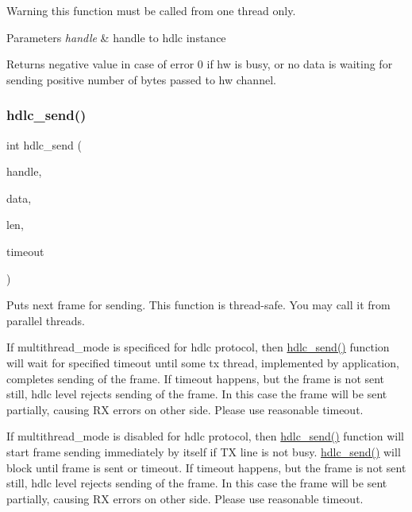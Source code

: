 \begin{DoxyWarning}{Warning}
this function must be called from one thread only.
\end{DoxyWarning}

\begin{DoxyParams}{Parameters}
{\em handle} & handle to hdlc instance \\
\hline
\end{DoxyParams}
\begin{DoxyReturn}{Returns}
negative value in case of error 0 if hw is busy, or no data is waiting for sending positive number of bytes passed to hw channel. 
\end{DoxyReturn}
\mbox{\label{group__HDLC__API_ga8b5cc456927145cebd82b2b560a6fa10}} 
\subsubsection{\texorpdfstring{hdlc\+\_\+send()}{hdlc\_send()}}
{\footnotesize\ttfamily int hdlc\+\_\+send (\begin{DoxyParamCaption}\item[{\hyperlink{group__HDLC__API_gabeaf7578aed5279d3af891bd85a9f961}{hdlc\+\_\+handle\+\_\+t}}]{handle,  }\item[{const void $\ast$}]{data,  }\item[{int}]{len,  }\item[{uint32\+\_\+t}]{timeout }\end{DoxyParamCaption})}

Puts next frame for sending. This function is thread-\/safe. You may call it from parallel threads.

If multithread\+\_\+mode is specificed for hdlc protocol, then \hyperlink{group__HDLC__API_ga8b5cc456927145cebd82b2b560a6fa10}{hdlc\+\_\+send()} function will wait for specified timeout until some tx thread, implemented by application, completes sending of the frame. If timeout happens, but the frame is not sent still, hdlc level rejects sending of the frame. In this case the frame will be sent partially, causing RX errors on other side. Please use reasonable timeout.

If multithread\+\_\+mode is disabled for hdlc protocol, then \hyperlink{group__HDLC__API_ga8b5cc456927145cebd82b2b560a6fa10}{hdlc\+\_\+send()} function will start frame sending immediately by itself if TX line is not busy. \hyperlink{group__HDLC__API_ga8b5cc456927145cebd82b2b560a6fa10}{hdlc\+\_\+send()} will block until frame is sent or timeout. If timeout happens, but the frame is not sent still, hdlc level rejects sending of the frame. In this case the frame will be sent partially, causing RX errors on other side. Please use reasonable timeout.

